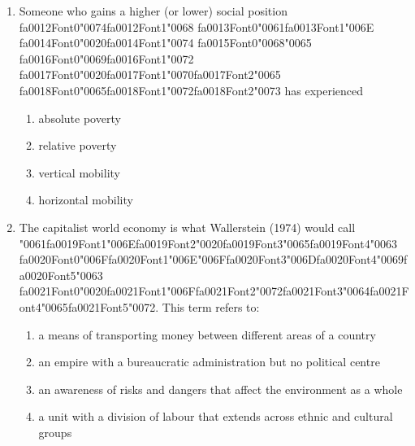 \documentclass[12pt]{article}
\begin{document}
\begin{enumerate}[label=\arabic*.]
\begin{enumerate}[label=(\alph*)]
\end{enumerate}
\item Someone who gains a higher (or lower) social position {\csname fa0012Font0\endcsname\char"0074}{\csname fa0012Font1\endcsname\char"0068} {\csname fa0013Font0\endcsname\char"0061}{\csname fa0013Font1\endcsname\char"006E} {\csname fa0014Font0\endcsname\char"0020}{\csname fa0014Font1\endcsname\char"0074} {\csname fa0015Font0\endcsname\char"0068}{\char"0065} {\csname fa0016Font0\endcsname\char"0069}{\csname fa0016Font1\endcsname\char"0072} {\csname fa0017Font0\endcsname\char"0020}{\csname fa0017Font1\endcsname\char"0070}{\csname fa0017Font2\endcsname\char"0065} {\csname fa0018Font0\endcsname\char"0065}{\csname fa0018Font1\endcsname\char"0072}{\csname fa0018Font2\endcsname\char"0073} has experienced
\begin{enumerate}[label=(\alph*)]
    \item absolute poverty
    \item relative poverty
    \item vertical mobility
    \item horizontal mobility
\end{enumerate}
\item The capitalist world economy is what Wallerstein (1974) would call {\char"0061}{\csname fa0019Font1\endcsname\char"006E}{\csname fa0019Font2\endcsname\char"0020}{\csname fa0019Font3\endcsname\char"0065}{\csname fa0019Font4\endcsname\char"0063} {\csname fa0020Font0\endcsname\char"006F}{\csname fa0020Font1\endcsname\char"006E}{\char"006F}{\csname fa0020Font3\endcsname\char"006D}{\csname fa0020Font4\endcsname\char"0069}{\csname fa0020Font5\endcsname\char"0063} {\csname fa0021Font0\endcsname\char"0020}{\csname fa0021Font1\endcsname\char"006F}{\csname fa0021Font2\endcsname\char"0072}{\csname fa0021Font3\endcsname\char"0064}{\csname fa0021Font4\endcsname\char"0065}{\csname fa0021Font5\endcsname\char"0072}. This term refers to:
\begin{enumerate}[label=(\alph*)]
    \item a means of transporting money between different areas of a country
    \item an empire with a bureaucratic administration but no political centre
    \item an awareness of risks and dangers that affect the environment as a whole
    \item a unit with a division of labour that extends across ethnic and cultural groups
\end{enumerate}

\end{enumerate}
\end{document}
